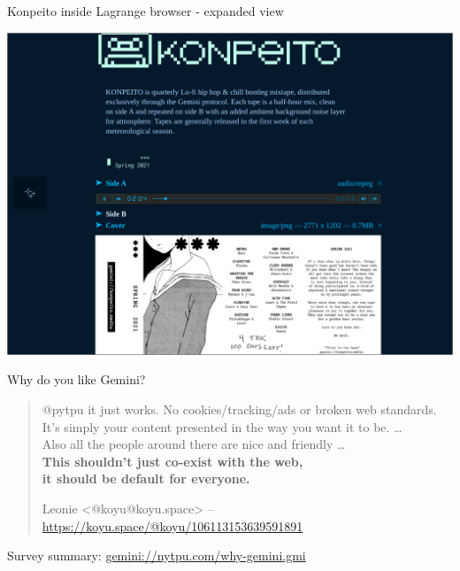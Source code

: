 \documentclass[presentation, 11pt,  aspectratio=169]{beamer}
\renewcommand{\alert}[1]{\textbf{\textcolor{mydarkred}{#1}}}
\begin{document}
\begin{frame}[label={sec:org75e4aab}]{Konpeito inside Lagrange browser - expanded view}
\begin{center}
\includegraphics[width=0.75\linewidth]{images/konpeito-expanded-in-Lagrange.png}
\end{center}
\end{frame}

\begin{frame}[label={sec:org2261133}]{Why do you like Gemini?}
\vspace{2em}
\begin{quote}
@pytpu it just works. No cookies/tracking/ads or broken web standards.\\

It's simply your content presented in the way you want it to be. \ldots\\

Also all the people around there are nice and friendly \ldots{}\\

\alert{This shouldn't just co-exist with the web, \\
it should be default for everyone.}\\

\begin{scriptsize}
Leonie <@koyu@koyu.space> -- \url{https://koyu.space/@koyu/106113153639591891}\\
\end{scriptsize}
\end{quote}

\vspace{2em}
\begin{scriptsize}
Survey summary: \href{gemini://nytpu.com/why-gemini.gmi}{gemini://nytpu.com/why-gemini.gmi}\\
\end{scriptsize}
\end{frame}
\end{document}
